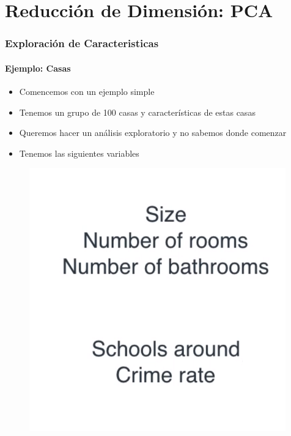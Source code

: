 \documentclass[
  shownotes,
  xcolor={svgnames},
  hyperref={colorlinks,citecolor=DarkBlue,linkcolor=DarkRed,urlcolor=DarkBlue}
  , aspectratio=169]{beamer}
\begin{document}
\section{Reducción de Dimensión: PCA}
\begin{frame}
\frametitle{Exploración de Caracteristicas}
\framesubtitle{Ejemplo: Casas}


\begin{itemize}
  \item Comencemos con un ejemplo simple
  \item Tenemos un grupo de 100 casas y características de estas casas
  \item Queremos hacer un análisis exploratorio y no sabemos donde comenzar
  \item Tenemos las siguientes variables
\end{itemize}
\begin{figure}[H] \centering

    \centering
    \includegraphics[scale=.35]{figures/pca0}
  \\
  \tiny
\end{figure}

\end{frame}
\end{document}
